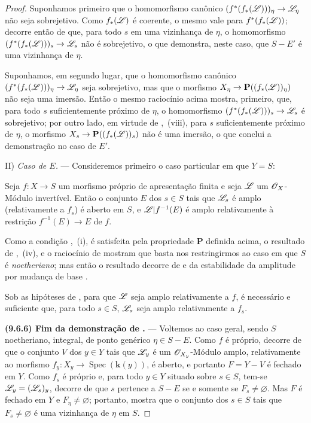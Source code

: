 \begin{proof}
Suponhamos primeiro que o homomorfismo canônico $(f^*(f_*(\sh{L})))_\eta\to\sh{L}_\eta$ não seja sobrejetivo.
Como $f_*(\mathscr{L})$ é coerente, o mesmo vale para $f^*(f_*(\mathscr{L}))$; decorre então de  que, para todo $s$ em uma vizinhança de $\eta$, o homomorfismo $(f^*(f_*(\sh{L})))_s\to\sh{L}_s$ não é sobrejetivo, o que demonstra, neste caso, que $S-E'$ é uma vizinhança de $\eta$.

Suponhamos, em segundo lugar, que o homomorfismo canônico $(f^*(f_*(\sh{L})))_\eta\to\sh{L}_\eta$ seja sobrejetivo, mas que o morfismo $X_\eta\to\mathbf{P}((f_*(\sh{L}))_\eta)$ não seja uma imersão.
Então o mesmo raciocínio acima mostra, primeiro, que, para todo $s$ suficientemente próximo de $\eta$, o homomorfismo $(f^*(f_*(\sh{L})))_s\to\sh{L}_s$ é sobrejetivo; por outro lado, em virtude de ,~(viii), para $s$ suficientemente próximo de $\eta$, o morfismo $X_s\to\mathbf{P}((f_*(\sh{L}))_s)$ não é uma imersão, o que conclui a demonstração no caso de $E'$.

II) \emph{Caso de $E$.} --- Consideremos primeiro o caso particular em que $Y=S$:

\begin{corollary}[9.6.4]
\label{IV.9.6.4}
Seja $f:X\to S$ um morfismo próprio de apresentação finita e seja $\mathscr{L}$ um $\mathscr{O}_X$-Módulo invertível.
Então o conjunto $E$ dos $s\in S$ tais que $\mathscr{L}_s$ é amplo (relativamente a $f_s$) é aberto em $S$, e $\mathscr{L}|f^{-1}(E)$ é amplo relativamente à restrição $f^{-1}(E)\to E$ de $f$.
\end{corollary}

Como a condição ,~(i), é satisfeita pela propriedade $\mathbf{P}$ definida acima, o resultado de ,~(iv), e o raciocínio de  mostram que basta nos restringirmos ao caso em que $S$ é \emph{noetheriano}; mas então o resultado decorre de  e da estabilidade da amplitude por mudança de base .

\begin{corollary}[9.6.5]
\label{IV.9.6.5}
Sob as hipóteses de , para que $\mathscr{L}$ seja amplo relativamente a $f$, é necessário e suficiente que, para todo $s\in S$, $\mathscr{L}_s$ seja amplo relativamente a $f_s$.
\end{corollary}

\label{IV.9.6.6}%
\textbf{(9.6.6) Fim da demonstração de .} ---
Voltemos ao caso geral, sendo $S$ noetheriano, integral, de ponto genérico $\eta\in S-E$.
Como $f$ é próprio, decorre de  que o conjunto $V$ dos $y\in Y$ tais que $\mathscr{L}_y$ é um $\mathscr{O}_{X_y}$-Módulo amplo, relativamente ao morfismo $f_y:X_y\to\operatorname{Spec}(\boldsymbol{k}(y))$, é aberto, e portanto $F=Y-V$ é fechado em $Y$.
Como $f_s$ é próprio e, para todo $y\in Y$ situado sobre $s\in S$, tem-se $\mathscr{L}_y=(\mathscr{L}_s)_y$, decorre de  que $s$ pertence a $S-E$ se e somente se $F_s\neq\varnothing$.
Mas $F$ é fechado em $Y$ e $F_\eta\neq\varnothing$; portanto,  mostra que o conjunto dos $s\in S$ tais que $F_s\neq\varnothing$ é uma vizinhança de $\eta$ em $S$.
\end{proof}


